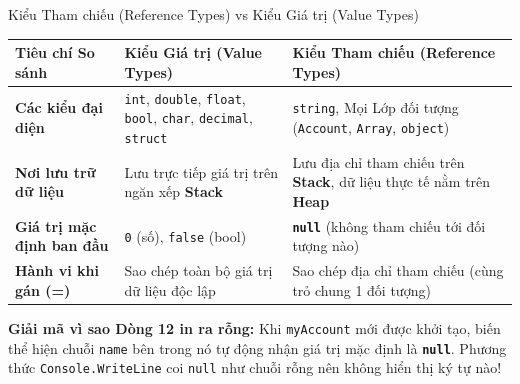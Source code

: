 \documentclass[aspectratio=169, 10pt]{beamer}
\begin{document}
\begin{frame}{Kiểu Tham chiếu (Reference Types) vs Kiểu Giá trị (Value Types)}
  \begin{table}
    \centering\small
    \begin{tabularx}{\textwidth}{lXX}
      \toprule
      \textbf{Tiêu chí So sánh} & \textbf{Kiểu Giá trị (Value Types)} & \textbf{Kiểu Tham chiếu (Reference Types)} \\
      \midrule
      \textbf{Các kiểu đại diện} & \texttt{int}, \texttt{double}, \texttt{float}, \texttt{bool}, \texttt{char}, \texttt{decimal}, \texttt{struct} & \texttt{string}, Mọi Lớp đối tượng (\texttt{Account}, \texttt{Array}, \texttt{object}) \\
      \textbf{Nơi lưu trữ dữ liệu} & Lưu trực tiếp giá trị trên ngăn xếp \textbf{Stack} & Lưu địa chỉ tham chiếu trên \textbf{Stack}, dữ liệu thực tế nằm trên \textbf{Heap} \\
      \textbf{Giá trị mặc định ban đầu} & \texttt{0} (số), \texttt{false} (bool) & \textbf{\texttt{null}} (không tham chiếu tới đối tượng nào) \\
      \textbf{Hành vi khi gán (=)} & Sao chép toàn bộ giá trị dữ liệu độc lập & Sao chép địa chỉ tham chiếu (cùng trỏ chung 1 đối tượng) \\
      \bottomrule
    \end{tabularx}
  \end{table}
  \vspace{2mm}
  \begin{alertblock}{\textbf{Giải mã vì sao Dòng 12 in ra rỗng:}}
    Khi \texttt{myAccount} mới được khởi tạo, biến thể hiện chuỗi \texttt{name} bên trong nó tự động nhận giá trị mặc định là \textbf{\texttt{null}}. Phương thức \texttt{Console.WriteLine} coi \texttt{null} như chuỗi rỗng nên không hiển thị ký tự nào!
  \end{alertblock}
\end{frame}
\end{document}
